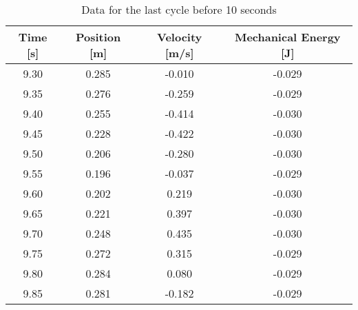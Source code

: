 \documentclass[titlepage]{article}
\begin{document}
            \begin{table}[H]
                \small
                \centering
                \begin{tabular}{|c|c|c|c|}
                    \hline
                    Time [s] & Position [m] & Velocity [m/s] & Mechanical Energy [J] \\
                    \hline
                    9.30     & 0.285        & -0.010         & -0.029                \\
                    \hline
                    9.35     & 0.276        & -0.259         & -0.029                \\
                    \hline
                    9.40     & 0.255        & -0.414         & -0.030                \\
                    \hline
                    9.45     & 0.228        & -0.422         & -0.030                \\
                    \hline
                    9.50     & 0.206        & -0.280         & -0.030                \\
                    \hline
                    9.55     & 0.196        & -0.037         & -0.029                \\
                    \hline
                    9.60     & 0.202        & 0.219          & -0.030                \\
                    \hline
                    9.65     & 0.221        & 0.397          & -0.030                \\
                    \hline
                    9.70     & 0.248        & 0.435          & -0.030                \\
                    \hline
                    9.75     & 0.272        & 0.315          & -0.029                \\
                    \hline
                    9.80     & 0.284        & 0.080          & -0.029                \\
                    \hline
                    9.85     & 0.281        & -0.182         & -0.029                \\
                    \hline
                \end{tabular} %
                \caption{Data for the last cycle before 10 seconds}\label{tab:last-cycle-before-10-seconds-mechanical-energy-table}
            \end{table}
\end{document}
